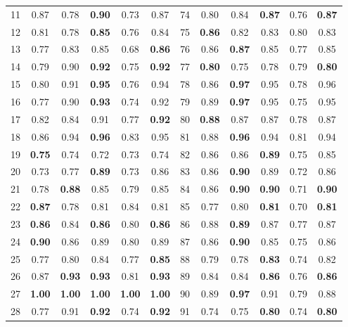 \documentclass{article}
\begin{document}
{\begin{longtable}{cccccc@{\qquad}cccccc}
11 & 0.87 & 0.78 & \textbf{0.90} & 0.73 & 0.87 & 74 & 0.80 & 0.84 & \textbf{0.87} & 0.76 & \textbf{0.87} \\
12 & 0.81 & 0.78 & \textbf{0.85} & 0.76 & 0.84 & 75 & \textbf{0.86} & 0.82 & 0.83 & 0.80 & 0.83 \\
13 & 0.77 & 0.83 & 0.85 & 0.68 & \textbf{0.86} & 76 & 0.86 & \textbf{0.87} & 0.85 & 0.77 & 0.85 \\
14 & 0.79 & 0.90 & \textbf{0.92} & 0.75 & \textbf{0.92} & 77 & \textbf{0.80} & 0.75 & 0.78 & 0.79 & \textbf{0.80} \\
15 & 0.80 & 0.91 & \textbf{0.95} & 0.76 & 0.94 & 78 & 0.86 & \textbf{0.97} & 0.95 & 0.78 & 0.96 \\
16 & 0.77 & 0.90 & \textbf{0.93} & 0.74 & 0.92 & 79 & 0.89 & \textbf{0.97} & 0.95 & 0.75 & 0.95 \\
17 & 0.82 & 0.84 & 0.91 & 0.77 & \textbf{0.92} & 80 & \textbf{0.88} & 0.87 & 0.87 & 0.78 & 0.87 \\
18 & 0.86 & 0.94 & \textbf{0.96} & 0.83 & 0.95 & 81 & 0.88 & \textbf{0.96} & 0.94 & 0.81 & 0.94 \\
19 & \textbf{0.75} & 0.74 & 0.72 & 0.73 & 0.74 & 82 & 0.86 & 0.86 & \textbf{0.89} & 0.75 & 0.85 \\
20 & 0.73 & 0.77 & \textbf{0.89} & 0.73 & 0.86 & 83 & 0.86 & \textbf{0.90} & 0.89 & 0.72 & 0.86 \\
21 & 0.78 & \textbf{0.88} & 0.85 & 0.79 & 0.85 & 84 & 0.86 & \textbf{0.90} & \textbf{0.90} & 0.71 & \textbf{0.90} \\
22 & \textbf{0.87} & 0.78 & 0.81 & 0.84 & 0.81 & 85 & 0.77 & 0.80 & \textbf{0.81} & 0.70 & \textbf{0.81} \\
23 & \textbf{0.86} & 0.84 & \textbf{0.86} & 0.80 & \textbf{0.86} & 86 & 0.88 & \textbf{0.89} & 0.87 & 0.77 & 0.87 \\
24 & \textbf{0.90} & 0.86 & 0.89 & 0.80 & 0.89 & 87 & 0.86 & \textbf{0.90} & 0.85 & 0.75 & 0.86 \\
25 & 0.77 & 0.80 & 0.84 & 0.77 & \textbf{0.85} & 88 & 0.79 & 0.78 & \textbf{0.83} & 0.74 & 0.82 \\
26 & 0.87 & \textbf{0.93} & \textbf{0.93} & 0.81 & \textbf{0.93} & 89 & 0.84 & 0.84 & \textbf{0.86} & 0.76 & \textbf{0.86} \\
27 & \textbf{1.00} & \textbf{1.00} & \textbf{1.00} & \textbf{1.00} & \textbf{1.00} & 90 & 0.89 & \textbf{0.97} & 0.91 & 0.79 & 0.88 \\
28 & 0.77 & 0.91 & \textbf{0.92} & 0.74 & \textbf{0.92} & 91 & 0.74 & 0.75 & \textbf{0.80} & 0.74 & \textbf{0.80} \\

\end{longtable}}
\end{document}
